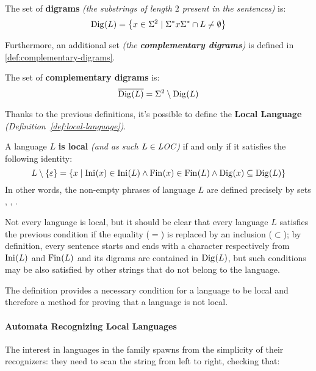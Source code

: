 \documentclass[english]{article}
\begin{document}
\begin{definition}
  \label{def:set-of-digrams}
  The set of \textbf{digrams} \textit{(the substrings of length \(2\) present in the sentences)} is:
  \[ \text{Dig}\hspace{0.1ex}(L) = \left\{ x \in \Sigma^2 \mid \Sigma^\ast x \Sigma^\ast \cap L \neq \emptyset \right\} \]
\end{definition}

Furthermore, an additional set \textit{(the \textbf{complementary digrams})} is defined in \ref{def:complementary-digrams}.

\begin{definition}
  \label{def:complementary-digrams}
  The set of \textbf{complementary digrams} is:
  \[ \overline{\text{Dig}\hspace{0.1ex}(L)} = \Sigma^2 \setminus \text{Dig}\hspace{0.1ex}(L) \]
\end{definition}

Thanks to the previous definitions, it's possible to define the \textbf{Local Language} \textit{(Definition~\ref{def:local-language})}.

\begin{definition}
  \label{def:local-language}
  A language \(L\) \textbf{is local} \textit{(and as such \(L \in \textit{LOC}\))} if and only if it satisfies the following identity:
  \[ L \setminus \left\{ \varepsilon \right\} = \left\{ x \mid \text{Ini}\hspace{0.1ex}(x) \in \text{Ini}\hspace{0.1ex}(L) \land \text{Fin}\hspace{0.1ex}(x) \in \text{Fin}\hspace{0.1ex}(L) \land \text{Dig}\hspace{0.1ex}(x) \subseteq \text{Dig}\hspace{0.1ex}(L) \right\} \]
  In other words, the non-empty phrases of language \(L\) are defined precisely by sets \Ini, \Fin, \Dig.
\end{definition}

\bigskip
Not every language is local, but it should be clear that every language \(L\) satisfies the previous condition if the equality (\(=\)) is replaced by an inclusion (\(\subset\));
by definition, every sentence starts and ends with a character respectively from \(\text{Ini}\hspace{0.1ex}(L)\) and \(\text{Fin}\hspace{0.1ex}(L)\) and its digrams are contained in \(\text{Dig}\hspace{0.1ex}(L)\), but such conditions may be also satisfied by other strings that do not belong to the language.

The definition provides a necessary condition for a language to be local and therefore a method for proving that a language is not local.

\paragraph{Automata Recognizing Local Languages}

The interest in languages in the \LOC family spawns from the simplicity of their recognizers:
they need to scan the string from left to right, checking that:
\end{document}
